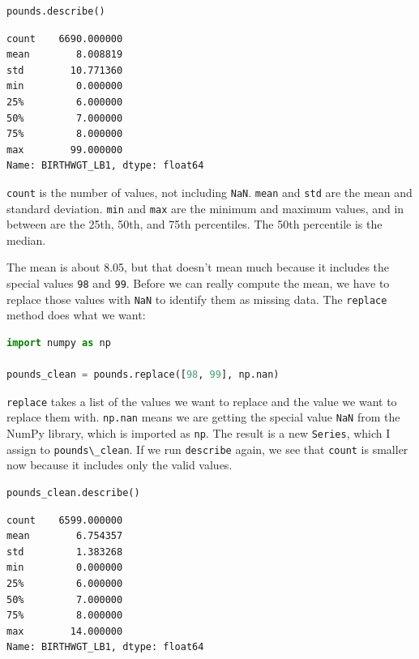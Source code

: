 \begin{lstlisting}[language=Python,style=source]
pounds.describe()
\end{lstlisting}

\begin{lstlisting}[style=output]
count    6690.000000
mean        8.008819
std        10.771360
min         0.000000
25%         6.000000
50%         7.000000
75%         8.000000
max        99.000000
Name: BIRTHWGT_LB1, dtype: float64
\end{lstlisting}

\passthrough{\lstinline!count!} is the number of values, not including
\passthrough{\lstinline!NaN!}. \passthrough{\lstinline!mean!} and
\passthrough{\lstinline!std!} are the mean and standard deviation.
\passthrough{\lstinline!min!} and \passthrough{\lstinline!max!} are the
minimum and maximum values, and in between are the 25th, 50th, and 75th
percentiles. The 50th percentile is the median.

The mean is about 8.05, but that doesn't mean much because it includes
the special values \passthrough{\lstinline!98!} and
\passthrough{\lstinline!99!}. Before we can really compute the mean, we
have to replace those values with \passthrough{\lstinline!NaN!} to
identify them as missing data. The \passthrough{\lstinline!replace!}
method does what we want:

\begin{lstlisting}[language=Python,style=source]
import numpy as np

pounds_clean = pounds.replace([98, 99], np.nan)
\end{lstlisting}

\passthrough{\lstinline!replace!} takes a list of the values we want to
replace and the value we want to replace them with.
\passthrough{\lstinline!np.nan!} means we are getting the special value
\passthrough{\lstinline!NaN!} from the NumPy library, which is imported
as \passthrough{\lstinline!np!}. The result is a new
\passthrough{\lstinline!Series!}, which I assign to
\passthrough{\lstinline!pounds\_clean!}. If we run
\passthrough{\lstinline!describe!} again, we see that
\passthrough{\lstinline!count!} is smaller now because it includes only
the valid values.

\begin{lstlisting}[language=Python,style=source]
pounds_clean.describe()
\end{lstlisting}

\begin{lstlisting}[style=output]
count    6599.000000
mean        6.754357
std         1.383268
min         0.000000
25%         6.000000
50%         7.000000
75%         8.000000
max        14.000000
Name: BIRTHWGT_LB1, dtype: float64
\end{lstlisting}

